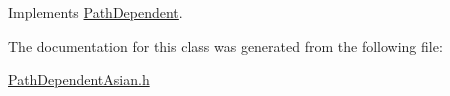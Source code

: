 Implements \hyperlink{classPathDependent_a4c8bf82be7f4443c5c8177d7500d542d}{Path\+Dependent}.



The documentation for this class was generated from the following file\+:\begin{DoxyCompactItemize}
\item 
\hyperlink{PathDependentAsian_8h}{Path\+Dependent\+Asian.\+h}\end{DoxyCompactItemize}
